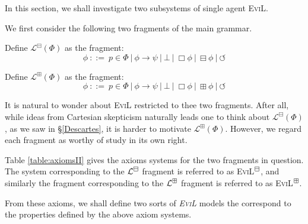 In this section, we shall investigate two subsystems of
single agent \textsc{EviL}.

We first consider the following two fragments of the main grammar.
\begin{definition}
Define $\mathcal{L}^\boxminus (\Phi)$ as the fragment:
\[ \phi \ {::=} \  p \in \Phi \  | \  \phi
   \rightarrow \psi \  | \  \bot \  |
   \  \Box \phi \  | \  \boxminus \phi
 \  | \ 
   \circlearrowleft \]

Define $\mathcal{L}^\boxplus (\Phi)$ as the fragment:
\[ \phi \ {::=} \  p \in \Phi \  | \  \phi
   \rightarrow \psi \  | \  \bot \  |
   \  \Box \phi 
   \  | \  \boxplus \phi
 \  | \ 
   \circlearrowleft \]
\end{definition}

It is natural to wonder about \textsc{EviL} restricted to thee two
fragments.  After all, while ideas from Cartesian skepticism
naturally leads one to think about $\mathcal{L}^\boxminus(\Phi)$, as we saw in \S\ref{Descartes}, 
it is harder to motivate $\mathcal{L}^\boxplus (\Phi)$.
However, we regard each fragment as worthy of study in its own right.

Table \ref{table:axiomsII} gives the axioms systems for the two
fragments in question.  The system corresponding to the
$\mathcal{L}^\boxminus$ fragment is referred to as \textsc{EviL}$^\boxminus$, and
similarly the fragment corresponding to the $\mathcal{L}^\boxplus$ fragment
is referred to as \textsc{EviL}$^\boxplus$.



From these axioms, we shall define two sorts of \emph{\textsc{EviL}} models the correspond to the properties defined by
the above axiom systems.


\pagebreak

